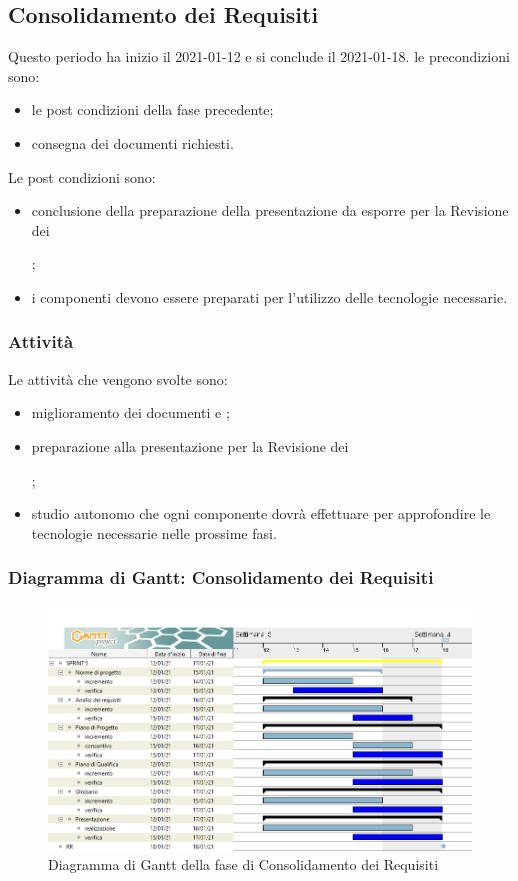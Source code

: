 \newpage
\subsection{Consolidamento dei Requisiti}
Questo periodo ha inizio il 2021-01-12 e si conclude il 2021-01-18.
le precondizioni sono:
\begin{itemize}
	\item le post condizioni della fase precedente;
	\item consegna dei documenti richiesti.
\end{itemize}
Le post condizioni sono:
\begin{itemize}
	\item conclusione della preparazione della presentazione da esporre per la Revisione dei ;
	\item i componenti devono essere preparati per l'utilizzo delle tecnologie necessarie.
\end{itemize}
\subsubsection{Attività}
Le attività che vengono svolte sono:
\begin{itemize}
	\item miglioramento dei documenti e ;
	\item preparazione alla presentazione per la Revisione dei ;
	\item studio autonomo che ogni componente dovrà effettuare per approfondire le tecnologie necessarie nelle prossime fasi.
\end{itemize}
\subsubsection{Diagramma di Gantt: Consolidamento dei Requisiti}
\begin{figure}[H]
    \centering
    \includegraphics[scale = 0.4]{components/img/consolidamento_requisiti.png}
    \caption{Diagramma di Gantt della fase di Consolidamento dei Requisiti}
    \label{fig:Diagramma di Gantt, fase di Consolidamento dei Requisiti}
\end{figure}

